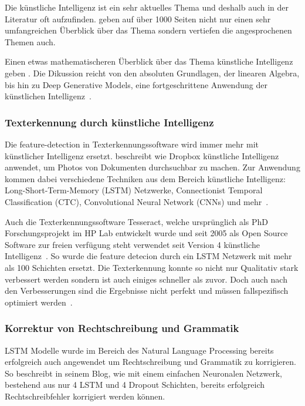 \documentclass{hwz}
\begin{document}
Die künstliche Intelligenz ist ein sehr aktuelles Thema und deshalb auch in der Literatur oft aufzufinden. \textcite{Russell2009ArtificialEdition} geben auf über 1000 Seiten nicht nur einen sehr umfangreichen Überblick über das Thema sondern vertiefen die angesprochenen Themen auch.

Einen etwas mathematischeren Überblick über das Thema künstliche Intelligenz geben \textcite{Goodfellow2016DeepLearning}. Die Dikussion reicht von den absoluten Grundlagen, der linearen Algebra, bis hin zu Deep Generative Models, eine fortgeschrittene Anwendung der künstlichen Intelligenz~\autocite{Goodfellow2016DeepLearning}.

\subsubsection{Texterkennung durch künstliche Intelligenz}

Die feature-detection in Texterkennungssoftware wird immer mehr mit künstlicher Intelligenz ersetzt. \textcite{Neuberg2017CreatingLearning} beschreibt wie Dropbox künstliche Intelligenz anwendet, um Photos von Dokumenten durchsuchbar zu machen. Zur Anwendung kommen dabei verschiedene Techniken aus dem Bereich künstliche Intelligenz: Long-Short-Term-Memory (LSTM) Netzwerke, Connectionist Temporal Classification (CTC), Convolutional Neural Network (CNNs) und mehr~\autocite{Neuberg2017CreatingLearning}.

Auch die Texterkennungssoftware Tesseract, welche ursprünglich als PhD Forschungsprojekt im HP Lab entwickelt wurde und seit 2005 als Open Source Software zur freien verfügung steht verwendet seit Version 4 künstliche Intelligenz~\autocite{Smith2007AnEngine, o.V.20184.0LSTM}. So wurde die feature detecion durch ein LSTM Netzwerk mit mehr als 100 Schichten ersetzt. Die Texterkennung konnte so nicht nur Qualitativ stark verbessert werden sondern ist auch einiges schneller als zuvor. Doch auch nach den Verbesserungen sind die Ergebnisse nicht perfekt und müssen fallspezifisch optimiert werden~\autocite{o.V.20184.0Performance, o.V.20184.0LSTM}.

\subsubsection{Korrektur von Rechtschreibung und Grammatik}

LSTM Modelle wurde im Bereich des Natural Language Processing bereits erfolgreich auch angewendet um Rechtschreibung und Grammatik zu korrigieren. So beschreibt \textcite{Weiss2016DeepSpelling} in seinem Blog, wie mit einem einfachen Neuronalen Netzwerk, bestehend aus nur 4 LSTM und 4 Dropout Schichten, bereits erfolgreich Rechtschreibfehler korrigiert werden können. 
\end{document}
